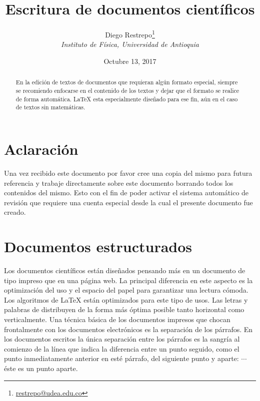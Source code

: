 \documentclass{article}
\title{Escritura de documentos científicos}
\author{Diego Restrepo\footnote{\href{mailto:restrepo@udea.edu.co}{restrepo@udea.edu.co}}\\
\textit{\small  Instituto de Física, Universidad de Antioquia}
}
\date{\small Octubre 13, 2017}
\begin{document}



\maketitle

\begin{abstract}
En la edición de textos de documentos que requieran algún formato
especial, siempre se recomiendo enfocarse en el contenido de los textos y
dejar que el formato se realice de forma automática. \LaTeX{} esta especialmente diseñado para ese fin, aún en el caso de textos sin matemáticas.
\end{abstract}
\section{Aclaración}
Una vez recibido este documento por favor cree una copia del mismo para futura referencia y trabaje directamente sobre este documento borrando todos los contenidos del mismo. Esto con el fin de poder activar el sistema automático de revisión que requiere una cuenta especial desde la cual el presente documento fue creado. 
\section{Documentos estructurados}
Los documentos científicos están diseñados pensando más en un documento de tipo impreso que en una página web. La principal diferencia en este aspecto es la optimización del uso y el espacio del papel para garantizar una lectura cómoda. Los algoritmos de \LaTeX{} están optimizados para este tipo de usos. Las letras y palabras de distribuyen de la forma más óptima posible tanto horizontal como verticalmente. Una técnica básica de los documentos impresos que chocan frontalmente con los documentos electrónicos es la separación de los párrafos. En los documentos escritos la única separación entre los párrafos es la sangría al comienzo de la línea que indica la diferencia entre un punto seguido, como el punto inmediatamente anterior en esté párrafo, del siguiente punto y aparte:  $\cdots$ \hfill éste es un punto aparte.
\end{document}
